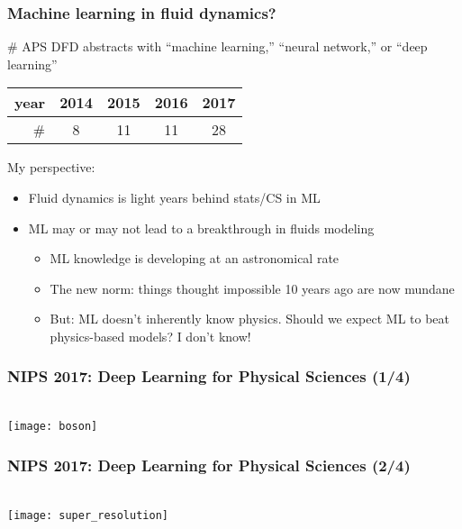 \begin{frame}
    \frametitle{Machine learning in fluid dynamics?}
    \# APS DFD abstracts with ``machine learning,'' ``neural network,'' or ``deep learning''

    \begin{center}
        \begin{tabular}{r|cccc}
            year & 2014 & 2015 & 2016 & 2017 \\
            \hline
            \# & 8 & 11 & 11 & \alert{28}
        \end{tabular}
    \end{center}
    \pause

    My perspective:

    \begin{itemize}
        \item Fluid dynamics is light years behind stats/CS in ML
        \item ML may or may not lead to a breakthrough in fluids modeling
        \begin{itemize}
            \item ML knowledge is developing at an astronomical rate
            \item The new norm: things thought impossible 10 years ago are now mundane
            \item But: ML doesn't inherently know physics.
            Should we expect ML to beat physics-based models?
            I don't know!
        \end{itemize}
    \end{itemize}
\end{frame}

\begin{frame}
    \frametitle{NIPS 2017: Deep Learning for Physical Sciences (1/4)}
     \citep{HenrionNIPS17} \\[1ex]

    \centering
    \texttt{[image: boson]}
\end{frame}

\begin{frame}
    \frametitle{NIPS 2017: Deep Learning for Physical Sciences (2/4)}
     \citep{WellingNIPS17} \\[1ex]

    \centering
    \texttt{[image: super\_resolution]}
\end{frame}

